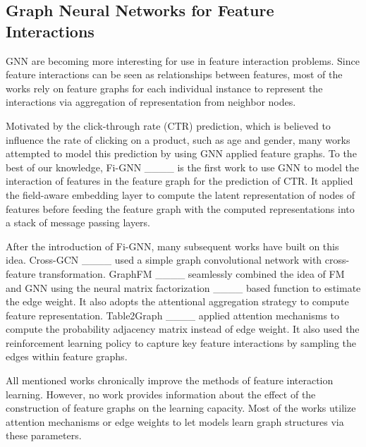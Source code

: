 \subsection{Graph Neural Networks for Feature Interactions}
GNN are becoming more interesting for use in feature interaction problems.
Since feature interactions can be seen as relationships between features, most of the works rely on feature graphs for each individual instance to represent the interactions via aggregation of representation from neighbor nodes.

Motivated by the click-through rate (CTR) prediction, which is believed to influence the rate of clicking on a product, such as age and gender, many works attempted to model this prediction by using GNN applied feature graphs.
To the best of our knowledge, Fi-GNN ____ is the first work to use GNN to model the interaction of features in the feature graph for the prediction of CTR.
It applied the field-aware embedding layer to compute the latent representation of nodes of features before feeding the feature graph with the computed representations into a stack of message passing layers.

After the introduction of Fi-GNN, many subsequent works have built on this idea.
Cross-GCN ____ used a simple graph convolutional network with cross-feature transformation.
GraphFM ____ seamlessly combined the idea of FM and GNN using the neural matrix factorization ____ based function to estimate the edge weight. It also adopts the attentional aggregation strategy to compute feature representation.
Table2Graph ____ applied attention mechanisms to compute the probability adjacency matrix instead of edge weight. It also used the reinforcement learning policy to capture key feature interactions by sampling the edges within feature graphs.

All mentioned works chronically improve the methods of feature interaction learning.
However, no work provides information about the effect of the construction of feature graphs on the learning capacity.
Most of the works utilize attention mechanisms or edge weights to let models learn graph structures via these parameters.